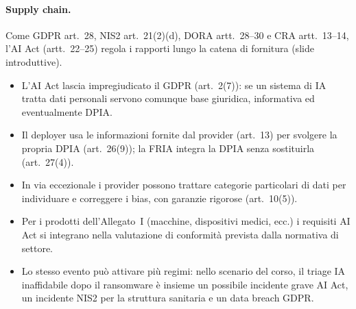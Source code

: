\paragraph{Supply chain.} Come GDPR art.~28, NIS2 art.~21(2)(d), DORA artt.~28--30 e CRA artt.~13--14,
l'AI Act (artt.~22--25) regola i rapporti lungo la catena di fornitura (slide introduttive).

\begin{integrazione}
\begin{itemize}
  \item L'AI Act lascia impregiudicato il GDPR (art.~2(7)): se un sistema di IA tratta dati personali
    servono comunque base giuridica, informativa ed eventualmente DPIA.
  \item Il deployer usa le informazioni fornite dal provider (art.~13) per svolgere la propria DPIA
    (art.~26(9)); la FRIA integra la DPIA senza sostituirla (art.~27(4)).
  \item In via eccezionale i provider possono trattare categorie particolari di dati per individuare e
    correggere i bias, con garanzie rigorose (art.~10(5)).
  \item Per i prodotti dell'Allegato~I (macchine, dispositivi medici, ecc.) i requisiti AI Act si
    integrano nella valutazione di conformità prevista dalla normativa di settore.
  \item Lo stesso evento può attivare più regimi: nello scenario del corso, il triage IA inaffidabile
    dopo il ransomware è insieme un possibile incidente grave AI Act, un incidente NIS2 per la
    struttura sanitaria e un data breach GDPR.
\end{itemize}
\end{integrazione}

